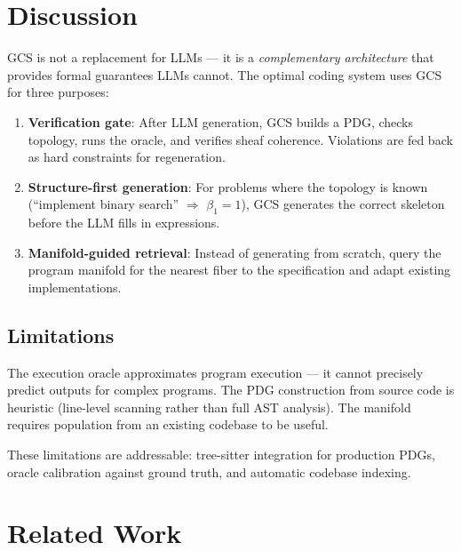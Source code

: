 \documentclass[11pt,a4paper]{article}
\begin{document}
\section{Discussion}

GCS is not a replacement for LLMs — it is a \emph{complementary architecture}
that provides formal guarantees LLMs cannot. The optimal coding system uses
GCS for three purposes:

\begin{enumerate}
    \item \textbf{Verification gate}: After LLM generation, GCS builds a PDG,
    checks topology, runs the oracle, and verifies sheaf coherence. Violations
    are fed back as hard constraints for regeneration.

    \item \textbf{Structure-first generation}: For problems where the topology
    is known (``implement binary search'' $\Rightarrow$ $\beta_1 = 1$), GCS
    generates the correct skeleton before the LLM fills in expressions.

    \item \textbf{Manifold-guided retrieval}: Instead of generating from scratch,
    query the program manifold for the nearest fiber to the specification and
    adapt existing implementations.
\end{enumerate}

\subsection{Limitations}

The execution oracle approximates program execution — it cannot precisely predict
outputs for complex programs. The PDG construction from source code is heuristic
(line-level scanning rather than full AST analysis). The manifold requires
population from an existing codebase to be useful.

These limitations are addressable: tree-sitter integration for production PDGs,
oracle calibration against ground truth, and automatic codebase indexing.

\section{Related Work}
\end{document}

